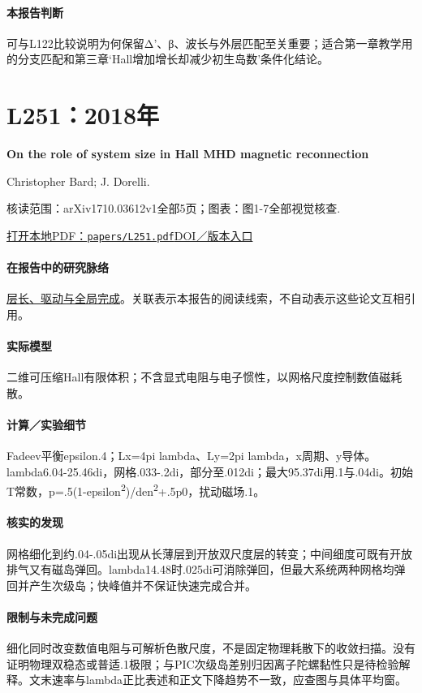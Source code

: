 \paragraph{本报告判断}可与L122比较说明为何保留Δ'、β、波长与外层匹配至关重要；适合第一章教学用的分支匹配和第三章‘Hall增加增长却减少初生岛数’条件化结论。

\section{L251：2018年}\label{paper:L251}

\textbf{On the role of system size in Hall MHD magnetic reconnection}\citep{L251}\

Christopher Bard;  J. Dorelli.

\textsf{核读范围：}arXiv1710.03612v1全部5页；\textsf{图表：}图1-7全部视觉核查.

\href{run:papers/L251.pdf}{打开本地PDF：\texttt{papers/L251.pdf}}\quad\href{https://doi.org/10.1063/1.5010785}{DOI／版本入口}

\paragraph{在报告中的研究脉络}\hyperref[story:global]{层长、驱动与全局完成}。关联表示本报告的阅读线索，不自动表示这些论文互相引用。

\paragraph{实际模型}二维可压缩Hall有限体积；不含显式电阻与电子惯性，以网格尺度控制数值磁耗散。

\paragraph{计算／实验细节}Fadeev平衡epsilon.4；Lx=4pi lambda、Ly=2pi lambda，x周期、y导体。lambda6.04-25.46di，网格.033-.2di，部分至.012di；最大95.37di用.1与.04di。初始T常数，p=.5(1-epsilon\textsuperscript{2})/den\textsuperscript{2}+.5p0，扰动磁场.1。

\paragraph{核实的发现}网格细化到约.04-.05di出现从长薄层到开放双尺度层的转变；中间细度可既有开放排气又有磁岛弹回。lambda14.48时.025di可消除弹回，但最大系统两种网格均弹回并产生次级岛；快峰值并不保证快速完成合并。

\paragraph{限制与未完成问题}细化同时改变数值电阻与可解析色散尺度，不是固定物理耗散下的收敛扫描。没有证明物理双稳态或普适.1极限；与PIC次级岛差别归因离子陀螺黏性只是待检验解释。文末速率与lambda正比表述和正文下降趋势不一致，应查图与具体平均窗。

